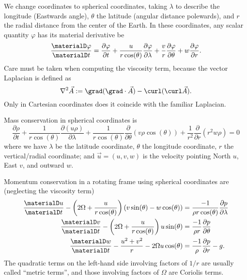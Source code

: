 We change coordinates to spherical coordinates, taking $\lambda$ to
describe the longitude (Eastwards angle), $\theta$ the latitude (angular
distance polewards), and $r$ the radial distance from the center of the
Earth. In these coordinates, any scalar quantity $\varphi$ has its
material derivative be
\begin{equation}
  \frac{\materialD\varphi}{\materialD t}
  = \frac{\partial\varphi}{\partial t}
    + \frac{u}{r\cos(\theta)}\frac{\partial\varphi}{\partial\lambda}
    + \frac{v}{r}\frac{\partial\varphi}{\partial\theta}
    + w\frac{\partial\varphi}{\partial r}.
\end{equation}
Care must be taken when computing the viscosity term, because the vector
Laplacian is defined as
\begin{equation}
  \nabla^{2}\vec{A} := \grad(\grad\cdot\vec{A}) - \curl(\curl\vec{A}).
\end{equation}
Only in Cartesian coordinates does it coincide with the familiar Laplacian.

\begin{prop}
  Mass conservation in spherical coordinates is
  \begin{equation}
    \frac{\partial\rho}{\partial t}
    + \frac{1}{r\cos(\theta)}\frac{\partial(u\rho)}{\partial\lambda}
    + \frac{1}{r\cos(\theta)}\frac{\partial}{\partial\theta}(v\rho\cos(\theta))
    + \frac{1}{r^{2}}\frac{\partial}{\partial r}(r^{2}w\rho)
    = 0
  \end{equation}
  where we have $\lambda$ be the latitude coordinate, $\theta$ the
  longitude coordinate, $r$ the vertical/radial coordinate; and
  $\vec{u}=(u,v,w)$ is the velocity pointing North $u$, East $v$, and
  outward $w$.
\end{prop}

\begin{prop}
  Momentum conservation in a rotating frame using spherical coordinates
  are (neglecting the viscosity term)
  \begin{subequations}
    \begin{align}
      \frac{\materialD u}{\materialD t} -\left(2\Omega + \frac{u}{r\cos(\theta)}\right)(v\sin(\theta)-w\cos(\theta))
      &= \frac{-1}{\rho r\cos(\theta)}\frac{\partial p}{\partial\lambda}\\
      \frac{\materialD v}{\materialD t} -\left(2\Omega + \frac{u}{r\cos(\theta)}\right)u\sin(\theta)
      &= \frac{-1}{\rho r}\frac{\partial p}{\partial\theta} \\
      \frac{\materialD w}{\materialD t} - \frac{u^{2}+v^{2}}{r} -
      2\Omega u\cos(\theta)
      &= \frac{-1}{\rho}\frac{\partial p}{\partial r}-g.\label{eq:vertical-rotating-momentum-conservation}
    \end{align}
  \end{subequations}
  The quadratic terms on the left-hand side involving factors of $1/r$
  are usually called ``metric terms'', and those involving factors of
  $\Omega$ are Coriolis terms.
\end{prop}

